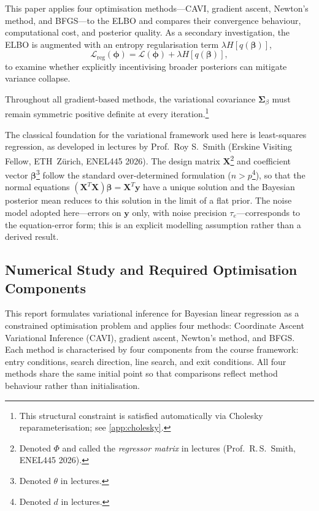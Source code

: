 \documentclass[11pt,a4paper]{article}
\begin{document}
This paper applies four optimisation methods---CAVI, gradient ascent, Newton's method, and BFGS---to the ELBO and compares their convergence behaviour, computational cost, and posterior quality.
As a secondary investigation, the ELBO is augmented with an entropy regularisation term $\lambda H[q(\bm{\beta})]$,
\begin{equation*}
    \mathcal{L}_{\mathrm{reg}}(\bm{\phi}) = \mathcal{L}(\bm{\phi}) + \lambda H[q(\bm{\beta})],
\end{equation*}
to examine whether explicitly incentivising broader posteriors can mitigate variance collapse.

Throughout all gradient-based methods, the variational covariance $\bm{\Sigma}_\beta$ must remain symmetric positive definite at every iteration.\footnote{This structural constraint is satisfied automatically via Cholesky reparameterisation; see \ref{app:cholesky}.}

The classical foundation for the variational framework used here is least-squares regression,
as developed in lectures by Prof.\ Roy S.\ Smith (Erskine Visiting Fellow, ETH~Z\"{u}rich,
ENEL445 2026). The design matrix $\bm{X}$\footnote{Denoted $\Phi$ and called the
\emph{regressor matrix} in lectures (Prof.\ R.\,S.\ Smith, ENEL445 2026).} and coefficient
vector $\bm{\beta}$\footnote{Denoted $\theta$ in lectures.} follow the standard
over-determined formulation ($n > p$\footnote{Denoted $d$ in lectures.}), so that the normal
equations $(\bm{X}^T\bm{X})\bm{\beta} = \bm{X}^T\bm{y}$ have a unique solution and the
Bayesian posterior mean reduces to this solution in the limit of a flat prior. The noise model
adopted here---errors on $\bm{y}$ only, with noise precision $\tau_e$---corresponds to the
equation-error form; this is an explicit modelling assumption rather than a derived result.


 
\subsection{Numerical Study and Required Optimisation Components}

This report formulates variational inference for Bayesian linear regression as a constrained optimisation problem and applies four methods: Coordinate Ascent Variational Inference (CAVI), gradient ascent, Newton's method, and BFGS. Each method is characterised by four components from the course framework: entry conditions, search direction, line search, and exit conditions. All four methods share the same initial point so that comparisons reflect method behaviour rather than initialisation.
\end{document}
